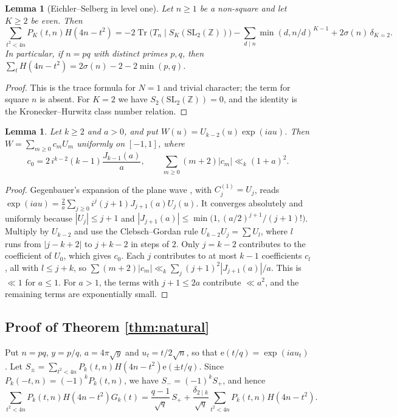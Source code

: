\documentclass[11pt]{amsart}
\newtheorem{lemma}[theorem]{Lemma}
\theoremstyle{remark}
\newcommand{\e}{\mathrm{e}}
\newcommand{\Tr}{\operatorname{Tr}}
\newcommand{\SL}{\mathrm{SL}_2(\mathbb Z)}
\begin{document}
\begin{lemma}[Eichler--Selberg in level one]\label{lem:ES1}
Let $n\ge1$ be a non-square and let $K\ge2$ be even. Then
\[
\sum_{t^2<4n}P_K(t,n)H(4n-t^2)=-2\Tr\bigl(T_n\mid S_K(\SL)\bigr)-\sum_{d\mid n}\min(d,n/d)^{K-1}+2\sigma(n)\,\delta_{K=2}.
\]
In particular, if $n=pq$ with distinct primes $p,q$, then $\sum_tH(4n-t^2)=2\sigma(n)-2-2\min(p,q)$.
\end{lemma}
\begin{proof}
This is the trace formula \cite[Thm.~12.4.11]{CS} for $N=1$ and trivial character; the term for square $n$ is absent. For $K=2$ we have $S_2(\SL)=0$, and the identity is the Kronecker--Hurwitz class number relation.
\end{proof}

\begin{lemma}\label{lem:cheb}
Let $k\ge2$ and $a>0$, and put $W(u)=U_{k-2}(u)\exp(iau)$. Then $W=\sum_{m\ge0}c_mU_m$ uniformly on $[-1,1]$, where
\[
c_0=2\,i^{k-2}(k-1)\frac{J_{k-1}(a)}{a},\qquad \sum_{m\ge0}(m+2)|c_m|\ll_k(1+a)^2 .
\]
\end{lemma}
\begin{proof}
Gegenbauer's expansion of the plane wave \cite[\S11.5]{Wat}, with $C^{(1)}_j=U_j$, reads $\exp(iau)=\frac2a\sum_{j\ge0}i^j(j+1)J_{j+1}(a)U_j(u)$. It converges absolutely and uniformly because $|U_j|\le j+1$ and $|J_{j+1}(a)|\le\min\bigl(1,(a/2)^{j+1}/(j+1)!\bigr)$. Multiply by $U_{k-2}$ and use the Clebsch--Gordan rule $U_{k-2}U_j=\sum U_l$, where $l$ runs from $|j-k+2|$ to $j+k-2$ in steps of $2$. Only $j=k-2$ contributes to the coefficient of $U_0$, which gives $c_0$. Each $j$ contributes to at most $k-1$ coefficients $c_l$, all with $l\le j+k$, so $\sum(m+2)|c_m|\ll_k\sum_j(j+1)^2|J_{j+1}(a)|/a$. This is $\ll1$ for $a\le1$. For $a>1$, the terms with $j+1\le2a$ contribute $\ll a^2$, and the remaining terms are exponentially small.
\end{proof}

\subsection{Proof of Theorem \ref{thm:natural}}
Put $n=pq$, $y=p/q$, $a=4\pi\sqrt y$ and $u_t=t/2\sqrt n$, so that $\e(t/q)=\exp(iau_t)$. Let $S_\pm=\sum_{t^2<4n}P_k(t,n)H(4n-t^2)\e(\pm t/q)$. Since $P_k(-t,n)=(-1)^kP_k(t,n)$, we have $S_-=(-1)^kS_+$, and hence
\[
\sum_{t^2<4n}P_k(t,n)H(4n-t^2)G_k(t)=\frac{q-1}{\sqrt q}\,S_++\frac{\delta_{2\mid k}}{\sqrt q}\sum_{t^2<4n}P_k(t,n)H(4n-t^2).
\]
\end{document}
